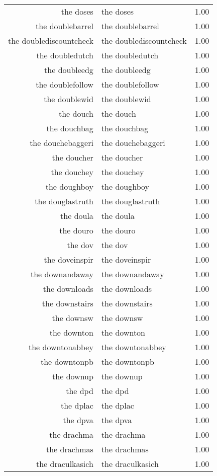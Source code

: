 \begin{table}[ht]
\begin{tabular}{rlr}
  the doses & the doses & 1.00 \\ 
  the doublebarrel & the doublebarrel & 1.00 \\ 
  the doublediscountcheck & the doublediscountcheck & 1.00 \\ 
  the doubledutch & the doubledutch & 1.00 \\ 
  the doubleedg & the doubleedg & 1.00 \\ 
  the doublefollow & the doublefollow & 1.00 \\ 
  the doublewid & the doublewid & 1.00 \\ 
  the douch & the douch & 1.00 \\ 
  the douchbag & the douchbag & 1.00 \\ 
  the douchebaggeri & the douchebaggeri & 1.00 \\ 
  the doucher & the doucher & 1.00 \\ 
  the douchey & the douchey & 1.00 \\ 
  the doughboy & the doughboy & 1.00 \\ 
  the douglastruth & the douglastruth & 1.00 \\ 
  the doula & the doula & 1.00 \\ 
  the douro & the douro & 1.00 \\ 
  the dov & the dov & 1.00 \\ 
  the doveinspir & the doveinspir & 1.00 \\ 
  the downandaway & the downandaway & 1.00 \\ 
  the downloads & the downloads & 1.00 \\ 
  the downstairs & the downstairs & 1.00 \\ 
  the downsw & the downsw & 1.00 \\ 
  the downton & the downton & 1.00 \\ 
  the downtonabbey & the downtonabbey & 1.00 \\ 
  the downtonpb & the downtonpb & 1.00 \\ 
  the downup & the downup & 1.00 \\ 
  the dpd & the dpd & 1.00 \\ 
  the dplac & the dplac & 1.00 \\ 
  the dpva & the dpva & 1.00 \\ 
  the drachma & the drachma & 1.00 \\ 
  the drachmas & the drachmas & 1.00 \\ 
  the draculkasich & the draculkasich & 1.00 \\ 

\end{tabular}
\end{table}
